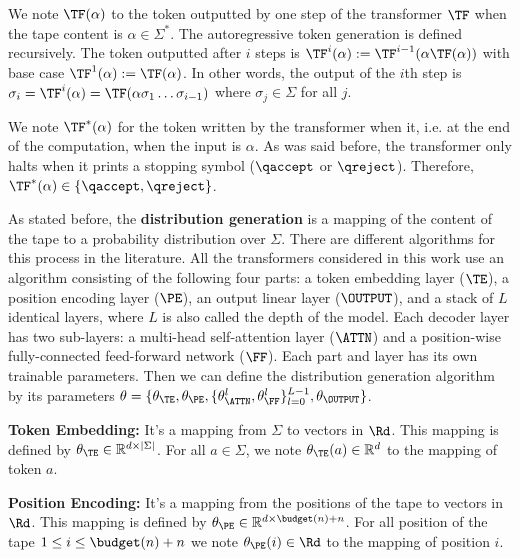 We note $\TF(\alpha)$ to the token outputted by one step of the transformer $\TF$ when the tape content is $\alpha \in \Sigma^*$.
The autoregressive token generation is defined recursively. The token outputted after $i$ steps is $\TF^{i}(\alpha) := \TF^{i-1}(\alpha \TF(\alpha))$ with base case $\TF^1(\alpha) := \TF(\alpha)$.
In other words, the output of the $i$th step is $\sigma_{i} = \TF^{i}(\alpha) = \TF(\alpha\sigma_{1}\dots\sigma_{i-1})$ where $\sigma_j \in \Sigma$ for all $j$.

We note $\TF^*(\alpha)$ for the token written by the transformer when it, i.e. at the end of the computation, when the input is $\alpha$.
As was said before, the transformer only halts when it prints a stopping symbol ($\qaccept$ or $\qreject$).
Therefore, $\TF^*(\alpha) \in \{\qaccept, \qreject\}$.







As stated before, the \textbf{distribution generation} is a mapping of the content of the tape to a probability distribution over $\Sigma$.
There are different algorithms for this process in the literature.
All the transformers considered in this work use an algorithm consisting of the following four parts: a token embedding layer ($\TE$), a position encoding layer ($\PE$), an output linear layer ($\OUTPUT$), and a stack of $L$ identical layers, where $L$ is also called the depth of the model. 
Each decoder layer has two sub-layers: a multi-head self-attention layer ($\ATTN$) and a position-wise fully-connected feed-forward network ($\FF$). 
Each part and layer has its own trainable parameters.
Then we can define the distribution generation algorithm by its parameters $\theta = \{\theta_\TE, \theta_\PE, \{\theta_\ATTN^{l}, \theta_\FF^{l}\}_{l=0}^{L-1}, \theta_\OUTPUT\}$.

\textbf{Token Embedding:} It's a mapping from $\Sigma$ to vectors in $\Rd$. This mapping is defined by $\theta_{\TE} \in \mathbb{R}^{d \times | \Sigma |}$. For all $a \in \Sigma$, we note $\theta_{\TE}(a) \in \mathbb{R}^d$ to the mapping of token $a$.

\textbf{Position Encoding:} It's a mapping from the positions of the tape to vectors in $\Rd$. This mapping is defined by $\theta_{\PE} \in \mathbb{R}^{d \times \budget(n) + n}$. For all position of the tape $1 \leq i \leq \budget(n) + n$ we note $\theta_{\PE}(i) \in \Rd$ to the mapping of position $i$.

